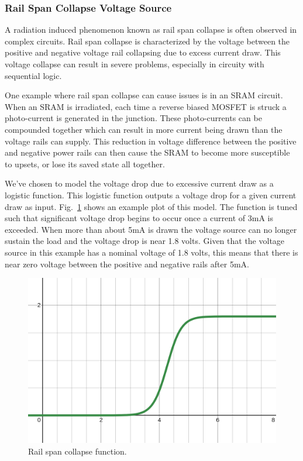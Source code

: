 \documentclass[conference]{IEEEtran}
\begin{document}
    \vspace{1em}

    \subsubsection{Rail Span Collapse Voltage Source}
    A radiation induced phenomenon known as rail span collapse is often observed in complex circuits.
    Rail span collapse is characterized by the voltage between the positive and negative voltage rail collapsing due to excess current draw.
    This voltage collapse can result in severe problems, especially in circuity with sequential logic.

    One example where rail span collapse can cause issues is in an SRAM circuit.
    When an SRAM is irradiated, each time a reverse biased MOSFET is struck a photo-current is generated in the junction.
    These photo-currents can be compounded together which can result in more current being drawn than the voltage rails can supply.
    This reduction in voltage difference between the positive and negative power rails can then cause the SRAM to become more susceptible to upsets, or lose its saved state all together.

    We've chosen to model the voltage drop due to excessive current draw as a logistic function.
    This logistic function outputs a voltage drop for a given current draw as input.
    Fig.~\ref{fig:rail_collapse_function} shows an example plot of this model.
    The function is tuned such that significant voltage drop begins to occur once a current of 3mA is exceeded.
    When more than about 5mA is drawn the voltage source can no longer sustain the load and the voltage drop is near 1.8 volts.
    Given that the voltage source in this example has a nominal voltage of 1.8 volts, this means that there is near zero voltage between the positive and negative rails after 5mA\@.

    \begin{figure}[htbp]
        \centering
        \includegraphics[width=0.95\linewidth]{rail_collapse_function}
        \caption{Rail span collapse function.}
        \label{fig:rail_collapse_function}
    \end{figure}
\end{document}
